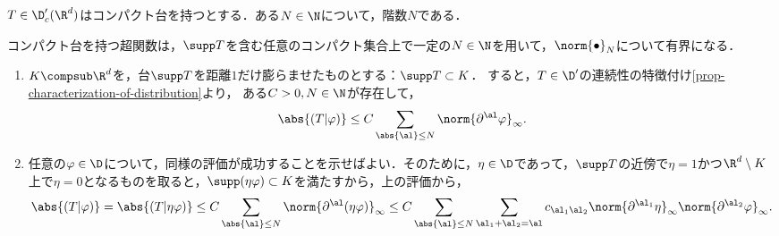 \documentclass[uplatex,dvipdfmx]{jsreport}
\begin{document}
\begin{proposition}[コンパクト台を持つ超関数は階数を持つ]\label{prop-order-of-distribution-with-compact-support}
    $T\in\D'_c(\R^d)$はコンパクト台を持つとする．ある$N\in\N$について，階数$N$である．
\end{proposition}
\begin{Proof}
    コンパクト台を持つ超関数は，$\supp T$を含む任意のコンパクト集合上で一定の$N\in\N$を用いて，$\norm{\bullet}_{N}$について有界になる．
    \begin{enumerate}[{Step}1]
        \item $K\compsub\R^d$を，台$\supp T$を距離$1$だけ膨らませたものとする：$\supp T\subset K$．
        すると，$T\in\D'$の連続性の特徴付け\ref{prop-characterization-of-distribution}より，
        ある$C>0,N\in\N$が存在して，
        \[\abs{(T|\varphi)}\le C\sum_{\abs{\al}\le N}\norm{\partial^\al\varphi}_\infty.\]
        \item 任意の$\varphi\in\D$について，同様の評価が成功することを示せばよい．そのために，$\eta\in\D$であって，$\supp T$の近傍で$\eta=1$かつ$\R^d\setminus K$上で$\eta=0$となるものを取ると，$\supp(\eta\varphi)\subset K$を満たすから，上の評価から，
        \[\abs{(T|\varphi)}=\abs{(T|\eta\varphi)}\le C\sum_{\abs{\al}\le N}\norm{\partial^\al(\eta\varphi)}_\infty\le C\sum_{\abs{\al}\le N}\sum_{\al_1+\al_2=\al}c_{\al_1\al_2}\norm{\partial^{\al_1}\eta}_\infty\norm{\partial^{\al_2}\varphi}_\infty.\]
    \end{enumerate}
\end{Proof}
\end{document}
